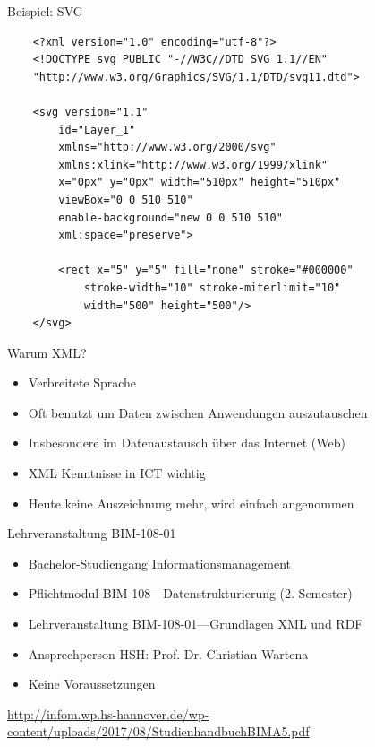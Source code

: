 \documentclass{beamer}
\begin{document}
\begin{frame}[fragile]{Beispiel: SVG}
	\small
	\begin{lstlisting}
	<?xml version="1.0" encoding="utf-8"?>
	<!DOCTYPE svg PUBLIC "-//W3C//DTD SVG 1.1//EN"
	"http://www.w3.org/Graphics/SVG/1.1/DTD/svg11.dtd">

	<svg version="1.1" 
		id="Layer_1" 
		xmlns="http://www.w3.org/2000/svg" 
		xmlns:xlink="http://www.w3.org/1999/xlink" 
		x="0px" y="0px" width="510px" height="510px" 
		viewBox="0 0 510 510" 
		enable-background="new 0 0 510 510" 
		xml:space="preserve">

		<rect x="5" y="5" fill="none" stroke="#000000" 
			stroke-width="10" stroke-miterlimit="10" 
			width="500" height="500"/>
	</svg>
	\end{lstlisting}	
\end{frame}

\begin{frame}{Warum XML?}
	
	\begin{itemize}
		\item Verbreitete Sprache
		\item Oft benutzt um Daten zwischen Anwendungen auszutauschen
		\item Insbesondere im Datenaustausch über das Internet (Web)
		\item XML Kenntnisse in ICT wichtig
		\item Heute keine Auszeichnung mehr, wird einfach angenommen
	\end{itemize}
	
\end{frame}

\begin{frame}{Lehrveranstaltung BIM-108-01}
	
	\begin{itemize}
		\item Bachelor-Studiengang Informationsmanagement
		\item Pflichtmodul BIM-108---Datenstrukturierung (2. Semester)
		\item Lehrveranstaltung BIM-108-01---Grundlagen XML und RDF
		\item Ansprechperson HSH: Prof. Dr. Christian Wartena
		\item Keine Voraussetzungen 
	\end{itemize}
	
	\vspace{0.5cm}
	
	\url{http://infom.wp.hs-hannover.de/wp-content/uploads/2017/08/StudienhandbuchBIMA5.pdf}
		
\end{frame}
\end{document}
